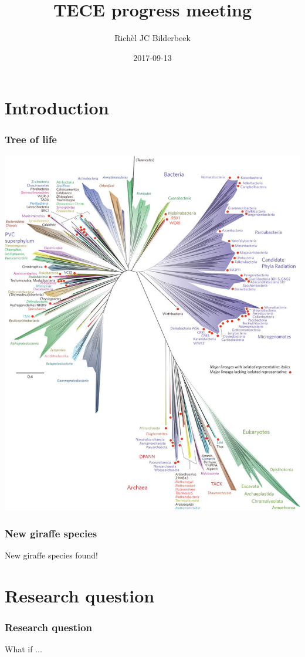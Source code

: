 \documentclass{beamer}
\title[]{TECE progress meeting}
\author[]{Rich\`{e}l JC Bilderbeek}
\institute[]{University of Groningen}
\date[]{2017-09-13}
\begin{document}
\frame{\titlepage}


\section[Section]{Introduction}

\begin{frame}
  \frametitle[]{Tree of life\footnotemark}
  \includegraphics[height=0.8\textheight]{tree_of_life_2016.jpg}
\end{frame}


\begin{frame}
  \frametitle{New giraffe species}

  New giraffe species found!

\end{frame}

\section[Section]{Research question}

\begin{frame}
  \frametitle{Research question}

  What if ...
\end{frame}
\end{document}
